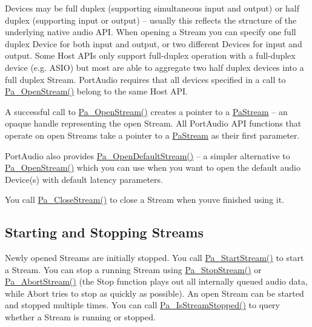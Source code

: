 Devices may be full duplex (supporting simultaneous input and output) or half duplex (supporting input or output) -- usually this reflects the structure of the underlying native audio A\+PI. When opening a Stream you can specify one full duplex Device for both input and output, or two different Devices for input and output. Some Host A\+P\+Is only support full-\/duplex operation with a full-\/duplex device (e.\+g. A\+S\+IO) but most are able to aggregate two half duplex devices into a full duplex Stream. Port\+Audio requires that all devices specified in a call to \hyperlink{portaudio_8h_a443ad16338191af364e3be988014cbbe}{Pa\+\_\+\+Open\+Stream()} belong to the same Host A\+PI.

A successful call to \hyperlink{portaudio_8h_a443ad16338191af364e3be988014cbbe}{Pa\+\_\+\+Open\+Stream()} creates a pointer to a \hyperlink{portaudio_8h_a19874734f89958fccf86785490d53b4c}{Pa\+Stream} -- an opaque handle representing the open Stream. All Port\+Audio A\+PI functions that operate on open Streams take a pointer to a \hyperlink{portaudio_8h_a19874734f89958fccf86785490d53b4c}{Pa\+Stream} as their first parameter.

Port\+Audio also provides \hyperlink{portaudio_8h_a0a12735ac191200f696a43b87667b714}{Pa\+\_\+\+Open\+Default\+Stream()} -- a simpler alternative to \hyperlink{portaudio_8h_a443ad16338191af364e3be988014cbbe}{Pa\+\_\+\+Open\+Stream()} which you can use when you want to open the default audio Device(s) with default latency parameters.

You call \hyperlink{portaudio_8h_a92f56f88cbd14da0e8e03077e835d104}{Pa\+\_\+\+Close\+Stream()} to close a Stream when you\textquotesingle{}ve finished using it.\hypertarget{api_overview_starting_and_stopping_streams}{}\subsection{Starting and Stopping Streams}\label{api_overview_starting_and_stopping_streams}
Newly opened Streams are initially stopped. You call \hyperlink{portaudio_8h_a7432aadd26c40452da12fa99fc1a047b}{Pa\+\_\+\+Start\+Stream()} to start a Stream. You can stop a running Stream using \hyperlink{portaudio_8h_af18dd60220251286c337631a855e38a0}{Pa\+\_\+\+Stop\+Stream()} or \hyperlink{portaudio_8h_a138e57abde4e833c457b64895f638a25}{Pa\+\_\+\+Abort\+Stream()} (the Stop function plays out all internally queued audio data, while Abort tries to stop as quickly as possible). An open Stream can be started and stopped multiple times. You can call \hyperlink{portaudio_8h_a52d778c985ae9d566de7e13529cc771f}{Pa\+\_\+\+Is\+Stream\+Stopped()} to query whether a Stream is running or stopped.

